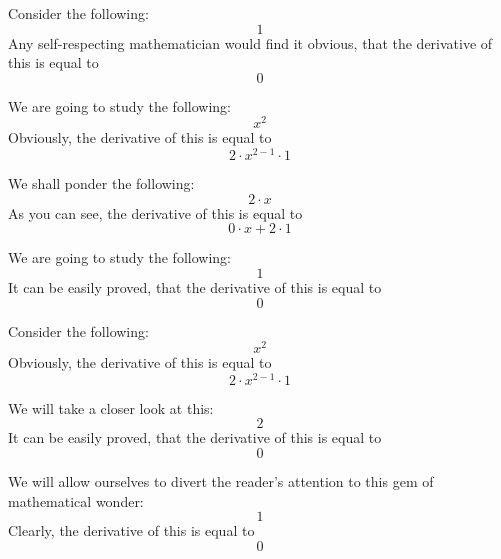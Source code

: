 \documentclass{article}
\begin{document}
Consider the following:
\begin{equation}
1 
\end{equation}
Any self-respecting mathematician would find it obvious, that the derivative of this is equal to
\begin{equation}
0 
\end{equation}

We are going to study the following:
\begin{equation}
x ^{2 } 
\end{equation}
Obviously, the derivative of this is equal to
\begin{equation}
2 \cdot x ^{2 - 1 } \cdot 1 
\end{equation}

We shall ponder the following:
\begin{equation}
2 \cdot x 
\end{equation}
As you can see, the derivative of this is equal to
\begin{equation}
0 \cdot x + 2 \cdot 1 
\end{equation}

We are going to study the following:
\begin{equation}
1 
\end{equation}
It can be easily proved, that the derivative of this is equal to
\begin{equation}
0 
\end{equation}

Consider the following:
\begin{equation}
x ^{2 } 
\end{equation}
Obviously, the derivative of this is equal to
\begin{equation}
2 \cdot x ^{2 - 1 } \cdot 1 
\end{equation}

We will take a closer look at this:
\begin{equation}
2 
\end{equation}
It can be easily proved, that the derivative of this is equal to
\begin{equation}
0 
\end{equation}

We will allow ourselves to divert the reader's attention to this gem of mathematical wonder:
\begin{equation}
1 
\end{equation}
Clearly, the derivative of this is equal to
\begin{equation}
0 
\end{equation}
\end{document}
